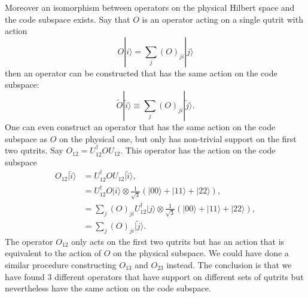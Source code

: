 \documentclass{PoS}
\newcommand{\ket}[1]{|#1\rangle}
\newcommand{\LF}{\left(}
\newcommand{\RF}{\right)}
\begin{document}
Moreover an isomorphism between operators on the physical Hilbert space and the code subspace exists. Say that $O$ is an operator acting on a single qutrit with action 
\begin{equation}
O\ket{i} = \sum\limits_j \LF O\RF_{ji}\ket{j}
\end{equation}
then an operator can be constructed that has the same action on the code subspace:
\begin{equation}
\tilde{O}\ket{\tilde{i}} \equiv \sum\limits_j  \LF O\RF_{ji}\ket{\tilde{j}}.
\end{equation}
One can even construct an operator that has the same action on the code subspace as $O$ on the physical one, but only has non-trivial support on the first two qutrits.
Say $O_{12} = U_{12}^\dagger O U_{12}$. This operator has the action on the code subspace
\begin{align}
O_{12}\ket{\tilde{i}} &= U_{12}^\dagger O U_{12} \ket{\tilde{i}},\nonumber\\
&= U_{12}^\dagger O  \ket{i} \otimes \frac{1}{\sqrt{3}}\LF \ket{00} + \ket{11} + \ket{22}\RF,\nonumber\\
&= \sum\limits_j \LF O \RF_{ji} U_{12}^\dagger \ket{j} \otimes \frac{1}{\sqrt{3}}\LF \ket{00} + \ket{11} + \ket{22}\RF,\nonumber\\
&= \sum\limits_{j} \LF O\RF_{ji}\ket{\tilde{j}}.
\end{align}
The operator $O_{12}$ only acts on the first two qutrits but has an action that is equivalent to the action of $O$ on the physical subspace. We could have done a similar procedure constructing $O_{13}$ and $O_{23}$ instead. The conclusion is that we have found $3$ different operators that have support on different sets of qutrits but nevertheless have the same action on the code subspace.
\end{document}
